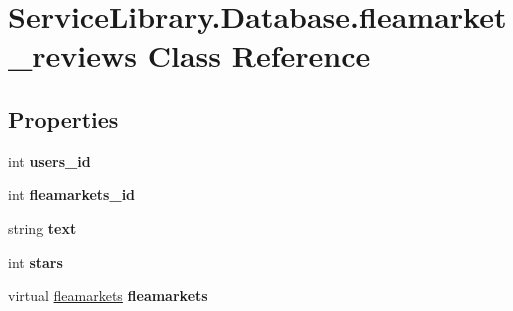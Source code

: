 \hypertarget{class_service_library_1_1_database_1_1fleamarket__reviews}{\section{Service\-Library.\-Database.\-fleamarket\-\_\-reviews Class Reference}
\label{class_service_library_1_1_database_1_1fleamarket__reviews}
}
\subsection*{Properties}
\begin{DoxyCompactItemize}
\item 
\hypertarget{class_service_library_1_1_database_1_1fleamarket__reviews_ac0563ebf354abef70816c8adaf5cc7a6}{int {\bfseries users\-\_\-id}}\label{class_service_library_1_1_database_1_1fleamarket__reviews_ac0563ebf354abef70816c8adaf5cc7a6}

\item 
\hypertarget{class_service_library_1_1_database_1_1fleamarket__reviews_a061da2fd1f910f5374036ee020e5e74f}{int {\bfseries fleamarkets\-\_\-id}}\label{class_service_library_1_1_database_1_1fleamarket__reviews_a061da2fd1f910f5374036ee020e5e74f}

\item 
\hypertarget{class_service_library_1_1_database_1_1fleamarket__reviews_a6b4b2e9f2a3f0e28f8351b5a1471c9b6}{string {\bfseries text}}\label{class_service_library_1_1_database_1_1fleamarket__reviews_a6b4b2e9f2a3f0e28f8351b5a1471c9b6}

\item 
\hypertarget{class_service_library_1_1_database_1_1fleamarket__reviews_ab5d4dc951343075041184af86506bd3d}{int {\bfseries stars}}\label{class_service_library_1_1_database_1_1fleamarket__reviews_ab5d4dc951343075041184af86506bd3d}

\item 
\hypertarget{class_service_library_1_1_database_1_1fleamarket__reviews_ab1178ba69003c5b0e48f3a4f9ec844e3}{virtual \hyperlink{class_service_library_1_1_database_1_1fleamarkets}{fleamarkets} {\bfseries fleamarkets}}\label{class_service_library_1_1_database_1_1fleamarket__reviews_ab1178ba69003c5b0e48f3a4f9ec844e3}


\end{DoxyCompactItemize}
